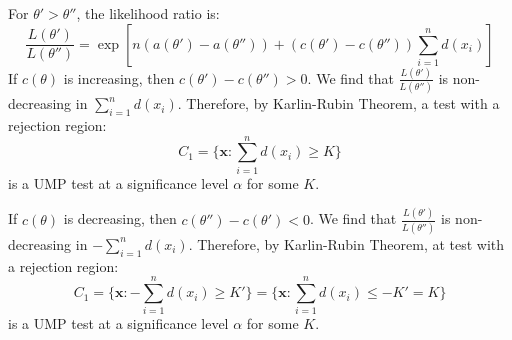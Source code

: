 \documentclass{huhtakm-template-book-v2}
\begin{document}
\newpage
\begin{proofing}
	For $\theta'>\theta''$, the likelihood ratio is:
	\begin{equation*}
		\frac{L(\theta')}{L(\theta'')}=\exp\left[n(a(\theta')-a(\theta''))+(c(\theta')-c(\theta''))\sum_{i=1}^{n}d(x_{i})\right]
	\end{equation*}
	If $c(\theta)$ is increasing, then $c(\theta')-c(\theta'')>0$. We find that $\frac{L(\theta')}{L(\theta'')}$ is non-decreasing in $\sum_{i=1}^{n}d(x_{i})$. Therefore, by Karlin-Rubin Theorem, a test with a rejection region:
	\begin{equation*}
		C_{1}=\biggl\{\mathbf{x}:\sum_{i=1}^{n}d(x_{i})\geq K\biggr\}
	\end{equation*}
	is a UMP test at a significance level $\alpha$ for some $K$.
	
	If $c(\theta)$ is decreasing, then $c(\theta'')-c(\theta')<0$. We find that $\frac{L(\theta')}{L(\theta'')}$ is non-decreasing in $-\sum_{i=1}^{n}d(x_{i})$. Therefore, by Karlin-Rubin Theorem, at test with a rejection region:
	\begin{equation*}
		C_{1}=\biggl\{\mathbf{x}:-\sum_{i=1}^{n}d(x_{i})\geq K'\biggr\}=\biggl\{\mathbf{x}:\sum_{i=1}^{n}d(x_{i})\leq -K'=K\biggr\}
	\end{equation*}
	is a UMP test at a significance level $\alpha$ for some $K$.
\end{proofing}
\end{document}
